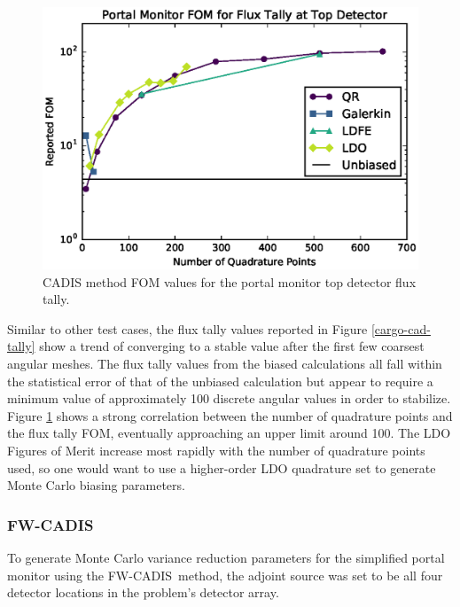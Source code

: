 \documentclass{article} %
\newcommand{\fwc}{\mbox{FW-CADIS}}
\begin{document}
\begin{figure}[!htb]
\centering
\includegraphics[max height=0.445\textheight]{img/portal-cadis-fom.eps}
\caption{CADIS method FOM values for the portal monitor top detector flux tally.}
\label{cargo-cad-fom}
\end{figure}

Similar to other test cases, the flux tally values reported in Figure 
\ref{cargo-cad-tally} show a trend of converging to a stable value after the
first few coarsest angular meshes. The flux tally values from the biased
calculations all fall within the statistical error of that of the unbiased
calculation but appear to require a minimum value of approximately 100
discrete angular values in order to stabilize. Figure \ref{cargo-cad-fom}
shows a strong correlation between the number of quadrature points and the
flux tally FOM, eventually approaching an upper limit around 100. The LDO
Figures of Merit increase most rapidly with the number of quadrature points
used, so one would want to use a higher-order LDO quadrature set to generate
Monte Carlo biasing parameters.

\FloatBarrier
\subsubsection{\fwc}

To generate Monte Carlo variance reduction parameters for the simplified portal
monitor using the \fwc\ method, the adjoint source was set to be all four
detector locations in the problem's detector array.
\end{document}
